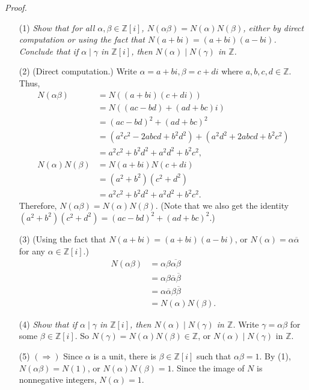 \documentclass{article}
\begin{document}
\emph{Proof.}
\begin{enumerate}
\item[(1)]
  \emph{Show that for all $\alpha, \beta \in \mathbb{Z}[i]$,
  $N(\alpha\beta) = N(\alpha)N(\beta)$,
  either by direct computation or using the fact that
  $N(a+bi) = (a+bi)(a-bi)$.
  Conclude that if $\alpha \mid \gamma$ in $\mathbb{Z}[i]$,
  then $N(\alpha) \mid N(\gamma)$ in $\mathbb{Z}$.}

\item[(2)]
  (Direct computation.)
  Write $\alpha = a+bi, \beta=c+di$ where $a, b, c, d \in \mathbb{Z}$.
  Thus,
  \begin{align*}
    N(\alpha\beta)
    &= N((a+bi)(c+di)) \\
    &= N((ac-bd) + (ad+bc)i) \\
    &= (ac-bd)^2 + (ad+bc)^2 \\
    &= (a^2 c^2 - 2abcd + b^2 d^2) + (a^2 d^2 + 2abcd + b^2 c^2) \\
    &= a^2 c^2 + b^2 d^2 + a^2 d^2 + b^2 c^2, \\
    N(\alpha)N(\beta)
    &= N(a+bi) N(c+di) \\
    &= (a^2 + b^2)(c^2 + d^2) \\
    &= a^2 c^2 + b^2 d^2 + a^2 d^2 + b^2 c^2.
  \end{align*}
  Therefore, $N(\alpha\beta) = N(\alpha)N(\beta)$.
  (Note that we also get the identity
  $(a^2 + b^2)(c^2 + d^2) = (ac-bd)^2 + (ad+bc)^2$.)

\item[(3)]
  (Using the fact that $N(a+bi) = (a+bi)(a-bi)$,
  or $N(\alpha) = \alpha \overline{\alpha}$
  for any $\alpha \in \mathbb{Z}[i]$.)
  \begin{align*}
    N(\alpha\beta)
    &= \alpha\beta\overline{\alpha\beta} \\
    &= \alpha\beta\overline{\alpha}\overline{\beta} \\
    &= \alpha\overline{\alpha}\beta\overline{\beta} \\
    &= N(\alpha)N(\beta).
  \end{align*}

\item[(4)]
  \emph{Show that if $\alpha \mid \gamma$ in $\mathbb{Z}[i]$,
  then $N(\alpha) \mid N(\gamma)$ in $\mathbb{Z}$.}
  Write $\gamma = \alpha \beta$ for some $\beta \in \mathbb{Z}[i]$.
  So $N(\gamma) = N(\alpha) N(\beta) \in \mathbb{Z}$,
  or $N(\alpha) \mid N(\gamma)$ in $\mathbb{Z}$.

\item[(5)]
  \emph{$(\Longrightarrow)$}
  Since $\alpha$ is a unit, there is $\beta \in \mathbb{Z}[i]$ such that
  $\alpha \beta = 1$.
  By (1), $N(\alpha \beta) = N(1)$, or $N(\alpha) N(\beta) = 1$.
  Since the image of $N$ is nonnegative integers, $N(\alpha) = 1$.


\end{enumerate}
\end{document}
